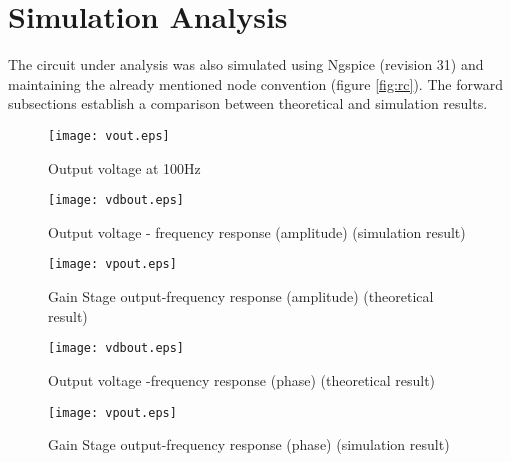 \section{Simulation Analysis}
\label{sec:simulation}

The circuit under analysis was also simulated using Ngspice (revision 31) and maintaining the already mentioned node convention (figure \ref{fig:rc}). The forward subsections establish a comparison between theoretical and simulation results.




\begin{figure}[h] \centering
\texttt{[image: vout.eps]}%
\vspace{-5mm}
\caption{Output voltage at 100Hz}
\label{fig:vout}
\end{figure}
\vspace{-5mm}


\begin{figure}[h] \centering
  \begin{minipage}{.45\textwidth}
    \texttt{[image: vdbout.eps]}
    \caption{Output voltage - frequency response (amplitude) (simulation result)}
    \label{fig:vdbout}
  \end{minipage}%
    \hspace{2 mm}
  \begin{minipage}{.45\textwidth}
  \centering
    \texttt{[image: vpout.eps]}
    \caption{Gain Stage output-frequency response (amplitude) (theoretical result)}
    \label{fig:compvdbout}
      \end{minipage}%
\end{figure}

\begin{figure}[h] \centering
  \begin{minipage}{.45\textwidth}
    \texttt{[image: vdbout.eps]}
    \caption{Output voltage -frequency response (phase) (theoretical result)}
    \label{fig:vpout}
  \end{minipage}%
    \hspace{2 mm}
  \begin{minipage}{.45\textwidth}
  \centering
    \texttt{[image: vpout.eps]}
    \caption{Gain Stage output-frequency response (phase) (simulation result)}
    \label{fig:compvpout}
      \end{minipage}%
\end{figure}

